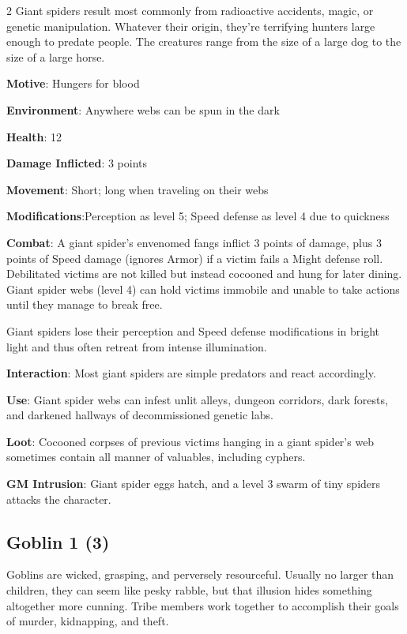 \begin{multicols}{2}
Giant spiders result most commonly from radioactive accidents, magic, or genetic manipulation. Whatever their origin, they’re terrifying hunters large enough to predate people. The creatures range from the size of a large dog to the size of a large horse.

\textbf{Motive}: Hungers for blood

\textbf{Environment}: Anywhere webs can be spun in the dark

\textbf{Health}: 12

\textbf{Damage Inflicted}: 3 points

\textbf{Movement}: Short; long when traveling on their webs

\textbf{Modifications}:Perception as level 5; Speed defense as level 4 due to quickness

\textbf{Combat}: A giant spider’s envenomed fangs inflict 3 points of damage, plus 3 points of Speed damage (ignores Armor) if a victim fails a Might defense roll. Debilitated victims are not killed but instead cocooned and hung for later dining. Giant spider webs (level 4) can hold victims immobile and unable to take actions until they manage to break free.

Giant spiders lose their perception and Speed defense modifications in bright light and thus often retreat from intense illumination.

\textbf{Interaction}: Most giant spiders are simple predators and react accordingly.

\textbf{Use}: Giant spider webs can infest unlit alleys, dungeon corridors, dark forests, and darkened hallways of decommissioned genetic labs.

\textbf{Loot}: Cocooned corpses of previous victims hanging in a giant spider’s web sometimes contain all manner of valuables, including cyphers.

\textbf{GM Intrusion}: Giant spider eggs hatch, and a level 3 swarm of tiny spiders attacks the character.
            
\subsection{Goblin	1 (3)}

Goblins are wicked, grasping, and perversely resourceful. Usually no larger than children, they can seem like pesky rabble, but that illusion hides something altogether more cunning. Tribe members work together to accomplish their goals of murder, kidnapping, and theft.


\end{multicols}
